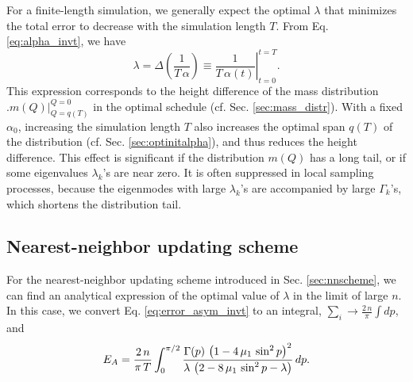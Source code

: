 \documentclass[reprint, floatfix]{revtex4-1}
\newcommand{\Err}{E}
\begin{document}
For a finite-length simulation,
we generally expect the optimal $\lambda$
that minimizes the total error to
decrease with the simulation length $T$.
%
From Eq. \eqref{eq:alpha_invt}, we have
$$
  \lambda
  =
  \Delta \left( \frac{ 1 } { T \, \alpha } \right)
  \equiv
  \left.
  \frac { 1 } { T \, \alpha(t) }
  \right|_{t = 0}^{t = T}
  .
$$
This expression corresponds to the height difference
of the mass distribution
$
\bigl. m(Q) \bigr|_{Q = q(T)}^{Q = 0}
$
in the optimal schedule
(cf. Sec. \ref{sec:mass_distr}).
%
With a fixed $\alpha_0$,
increasing the simulation length $T$
also increases the optimal span $q(T)$ of the distribution
(cf. Sec. \ref{sec:optinitalpha}),
and thus reduces the height difference.
%
This effect is significant
if the distribution $m(Q)$ has a long tail,
or if some eigenvalues $\lambda_k$'s are near zero.
%
It is often suppressed in local sampling processes,
because the eigenmodes with large $\lambda_k$'s
are accompanied by large $\Gamma_k$'s,
which shortens the distribution tail.





\subsection{Nearest-neighbor updating scheme}


For the nearest-neighbor updating scheme
introduced in Sec. \ref{sec:nnscheme},
we can find an analytical expression
of the optimal value of $\lambda$
in the limit of large $n$.
%
In this case,
we convert Eq.
\eqref{eq:error_asym_invt}
to an integral,
$\sum_i \to \frac{2 \, n}{\pi} \int dp$, and
%
\begin{align}
\Err_A
=
\frac{2 \, n}{\pi \, T}
\int_0^{\pi/2}
  \frac{ \Gamma(p) \, \left(1 - 4 \, \mu_1 \, \sin^2 p \right)^2    }
       {   \lambda \, \left(2 - 8 \, \mu_1 \, \sin^2 p - \lambda \right) }
\, dp.
\notag
\end{align}
\end{document}
